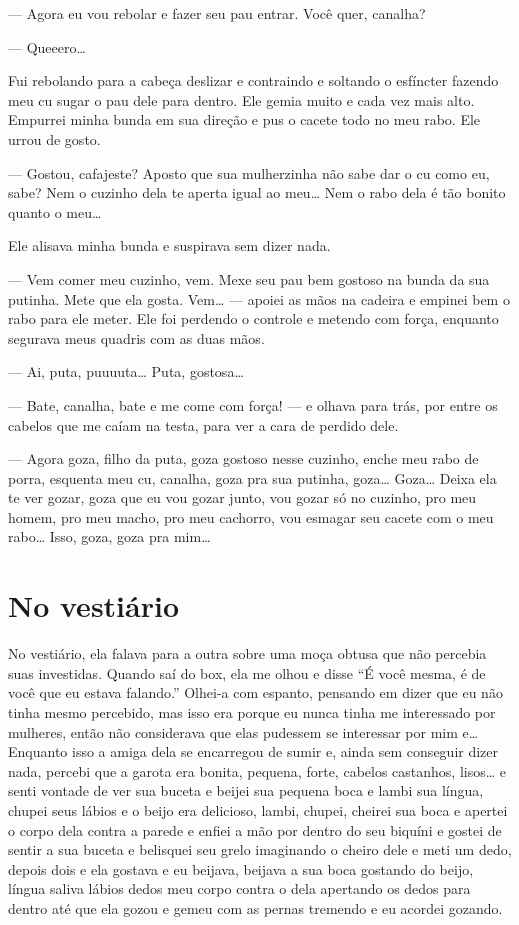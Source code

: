 --- Agora eu vou rebolar e fazer seu pau entrar. Você quer, canalha?

--- Queeero…

Fui rebolando para a cabeça deslizar e contraindo e soltando o esfíncter
fazendo meu cu sugar o pau dele para dentro. Ele gemia muito e cada vez
mais alto. Empurrei minha bunda em sua direção e pus o cacete todo no
meu rabo. Ele urrou de gosto.

--- Gostou, cafajeste? Aposto que sua mulherzinha não sabe dar o cu como
eu, sabe? Nem o cuzinho dela te aperta igual ao meu… Nem o rabo
dela é tão bonito quanto o meu…

Ele alisava minha bunda e suspirava sem dizer nada.

--- Vem comer meu cuzinho, vem. Mexe seu pau bem gostoso na bunda da sua
putinha. Mete que ela gosta. Vem… --- apoiei as mãos na cadeira e
empinei bem o rabo para ele meter. Ele foi perdendo o controle e metendo
com força, enquanto segurava meus quadris com as duas mãos.

--- Ai, puta, puuuuta… Puta, gostosa…

--- Bate, canalha, bate e me come com força! --- e olhava para trás, por
entre os cabelos que me caíam na testa, para ver a cara de perdido dele.

--- Agora goza, filho da puta, goza gostoso nesse cuzinho, enche meu
rabo de porra, esquenta meu cu, canalha, goza pra sua putinha,
goza… Goza… Deixa ela te ver gozar, goza que eu vou gozar
junto, vou gozar só no cuzinho, pro meu homem, pro meu macho, pro meu
cachorro, vou esmagar seu cacete com o meu rabo… Isso, goza, goza
pra mim…

\chapter{No vestiário}

No vestiário, ela falava para a outra sobre uma moça obtusa que não
percebia suas investidas. Quando saí do box, ela me olhou e disse ``É
você mesma, é de você que eu estava falando.'' Olhei-a com espanto,
pensando em dizer que eu não tinha mesmo percebido, mas isso era porque
eu nunca tinha me interessado por mulheres, então não considerava que
elas pudessem se interessar por mim e… Enquanto isso a amiga dela
se encarregou de sumir e, ainda sem conseguir dizer nada, percebi que a
garota era bonita, pequena, forte, cabelos castanhos, lisos… e
senti vontade de ver sua buceta e beijei sua pequena boca e lambi sua
língua, chupei seus lábios e o beijo era delicioso, lambi, chupei,
cheirei sua boca e apertei o corpo dela contra a parede e enfiei a mão
por dentro do seu biquíni e gostei de sentir a sua buceta e belisquei
seu grelo imaginando o cheiro dele e meti um dedo, depois dois e ela
gostava e eu beijava, beijava a sua boca gostando do beijo, língua
saliva lábios dedos meu corpo contra o dela apertando os dedos para
dentro até que ela gozou e gemeu com as pernas tremendo e eu acordei
gozando.

